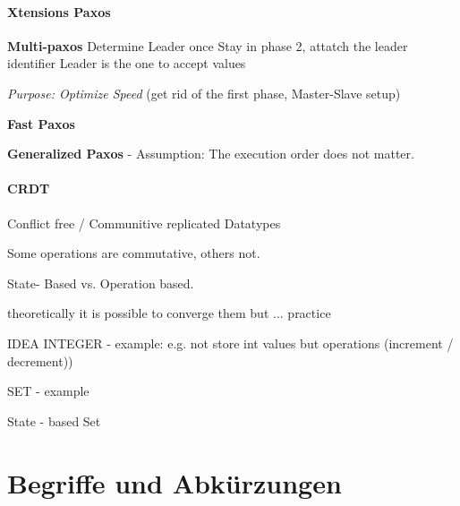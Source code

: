 \documentclass[a4paper,12pt]{article}%
\begin{document}
\paragraph{Xtensions Paxos}
	
	{\bf Multi-paxos}
	Determine Leader once
	Stay in phase 2, attatch the leader identifier
	Leader is the one to accept values
	
	{\it Purpose:  Optimize Speed} (get rid of the first phase, Master-Slave setup)
	
	
	{\bf Fast Paxos}
	
	{\bf Generalized Paxos}
	- Assumption: The execution order does not matter.

\paragraph{CRDT}
Conflict free / Communitive replicated Datatypes

Some operations are commutative, others not.

State- Based vs. Operation based.

theoretically it is possible to converge them but ... practice




IDEA
INTEGER  - example: 
e.g. not store int values but operations (increment / decrement))

SET - example

State - based Set


\section{Begriffe und Abkürzungen}
\end{document}
